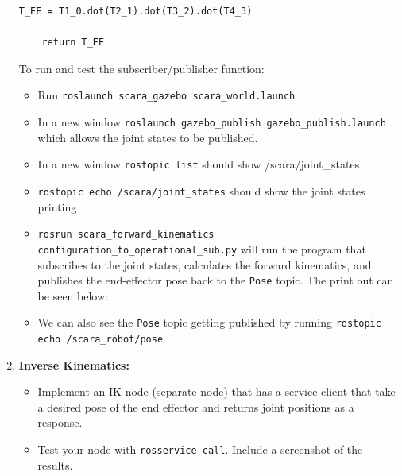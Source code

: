 \documentclass[10pt]{article}
\begin{document}
\begin{enumerate}
\begin{lstlisting}[style=Matlab-editor,basicstyle=\mlttfamily,escapechar=`]
	T_EE = T1_0.dot(T2_1).dot(T3_2).dot(T4_3)
	
	return T_EE
\end{lstlisting}
	

	To run and test the subscriber/publisher function:
	
	\begin{itemize}
		\item Run \texttt{roslaunch scara\_gazebo scara\_world.launch}
		\item In a new window \texttt{roslaunch gazebo\_publish gazebo\_publish.launch} which allows the joint states to be published.
		\item In a new window \texttt{rostopic list} should show /scara/joint\_states
		\item \texttt{rostopic echo /scara/joint\_states} should show the joint states printing
		\item \texttt{rosrun scara\_forward\_kinematics configuration\_to\_operational\_sub.py} will run the program that subscribes to the joint states, calculates the forward kinematics, and publishes the end-effector pose back to the \texttt{Pose} topic. The print out can be seen below:
		
		\begin{figure}[h]
			\centering
		\end{figure}
	
		\item We can also see the \texttt{Pose} topic getting published by running \texttt{rostopic echo /scara\_robot/pose}
		
	\end{itemize}

	\item \textbf{Inverse Kinematics:}
	
	\begin{itemize}
		\item Implement an IK node (separate node) that has a service client that take a desired pose of the end effector and returns joint positions as a response.
	
		\item Test your node with \texttt{rosservice call}. Include a screenshot of the results.
	\end{itemize}


\end{enumerate}
\end{document}
